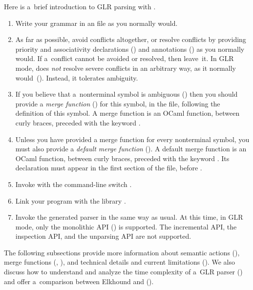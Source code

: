 Here is a~brief introduction to GLR parsing with \menhir.

\begin{enumerate}
\item Write your grammar in an \mly file as you normally would.
\item As far as possible,
      avoid conflicts altogether,
      or resolve conflicts by providing
      priority and associativity declarations
      ()
      and \dprec annotations
      ()
      as you normally would.
      If a~conflict cannot be avoided or resolved,
      then leave~it.
      In GLR mode, \menhir does \emph{not}
      resolve severe conflicts
      in an arbitrary way,
      as it normally would~().
      Instead, it tolerates ambiguity.
\item If you believe that a~nonterminal symbol is ambiguous
      ()
      then you should provide a \emph{merge function}
      ()
      for this symbol,
      in the \mly file,
      following the definition of this symbol.
      A merge function is an OCaml function, between curly braces,
      preceded with the keyword \dmerge.
\item Unless you have provided a merge function for every nonterminal symbol,
      you must also provide a \emph{default merge function}
      ().
      A default merge function is an OCaml function, between curly braces,
      preceded with the keyword \dmerge.
      Its declaration must appear in the first section of the \mly file,
      before \percentpercent.
\item Invoke \menhir with the command-line switch \oGLR.
\item Link your program with the library \menhirGLR.
\item Invoke the generated parser in the same way as usual.
      At this time, in GLR mode, only the monolithic API () is supported.
      The incremental API, the inspection API, and the unparsing API are not supported.
\end{enumerate}

The following subsections provide more information about
semantic actions (),
merge functions (, ),
and
technical details and current limitations ().
We also discuss how to understand and analyze the time complexity of
a~GLR parser ()
and offer a~comparison between Elkhound and \menhir ().

